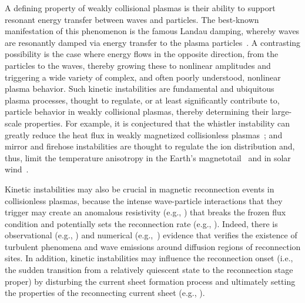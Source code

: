 \documentclass[%
 reprint,
 amsmath,
 amssymb,
 aps,
 prx,
floatfix,
superscriptaddress
]{revtex4-2}
\begin{document}
A defining property of weakly collisional plasmas is their ability to support resonant energy transfer between waves and particles. The best-known manifestation of this phenomenon is the famous Landau damping, whereby waves are resonantly damped via energy transfer to the plasma particles~\cite{Landau1946}. 
A contrasting possibility is the case where energy flows in the opposite direction, from the particles to the waves, thereby growing these to nonlinear amplitudes and triggering a wide variety of complex, and often poorly understood, nonlinear plasma behavior.
Such kinetic instabilities are fundamental and ubiquitous plasma processes, thought to regulate, or at least significantly contribute to, particle behavior in weakly collisional plasmas, thereby determining their large-scale properties.
For example, it is conjectured that the whistler instability can greatly reduce the heat flux in weakly magnetized collisionless plasmas~\cite{roberg2018suppression}; and mirror and firehose instabilities are thought to regulate the ion distribution and, thus, limit the temperature anisotropy in the Earth's magnetotail~\cite{zhang2018whistler} and in solar wind~\cite{alexandrova2013solar}.

Kinetic instabilities may also be crucial in magnetic reconnection events in collisionless plasmas, because the intense wave-particle interactions that they trigger may create an anomalous resistivity (e.g., \cite{Sagdeev1967, Galeev1984, Labelle1988}) that breaks the frozen flux condition and potentially sets the reconnection rate  (e.g., \cite{ji1998experimental, kulsrud1998magnetic, kulsrud2001magnetic,treumann2001origin, uzdensky2003petschek}).
Indeed, there is observational (e.g., \cite{Deng2001, Farrell2002, Matsumoto2003}) and numerical (e.g.,~\cite{drake2003formation, zhang2022}) evidence that verifies the existence of turbulent phenomena and wave emissions around diffusion regions of reconnection sites. 
In addition, kinetic instabilities may influence the reconnection onset (i.e., the sudden transition from a relatively quiescent state to the reconnection stage proper) by disturbing the current sheet formation process and ultimately setting the properties of the reconnecting current sheet (e.g., \cite{alt2019onset, winarto2021triggering}).
\end{document}
